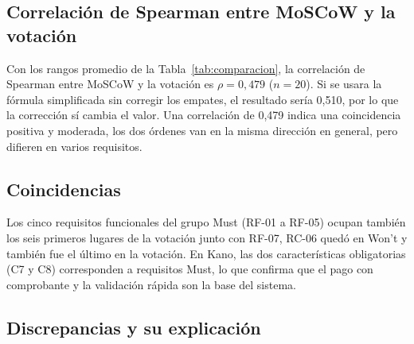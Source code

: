 \subsection{Correlación de Spearman entre MoSCoW y la votación}

Con los rangos promedio de la Tabla~\ref{tab:comparacion}, la correlación de Spearman entre MoSCoW y la votación es $\rho = 0{,}479$ ($n = 20$). Si se usara la fórmula simplificada sin corregir los empates, el resultado sería 0,510, por lo que la corrección sí cambia el valor. Una correlación de 0,479 indica una coincidencia positiva y moderada, los dos órdenes van en la misma dirección en general, pero difieren en varios requisitos.

\subsection{Coincidencias}

Los cinco requisitos funcionales del grupo Must (RF-01 a RF-05) ocupan también los seis primeros lugares de la votación junto con RF-07, RC-06 quedó en Won't y también fue el último en la votación. En Kano, las dos características obligatorias (C7 y C8) corresponden a requisitos Must, lo que confirma que el pago con comprobante y la validación rápida son la base del sistema.

\subsection{Discrepancias y su explicación}

